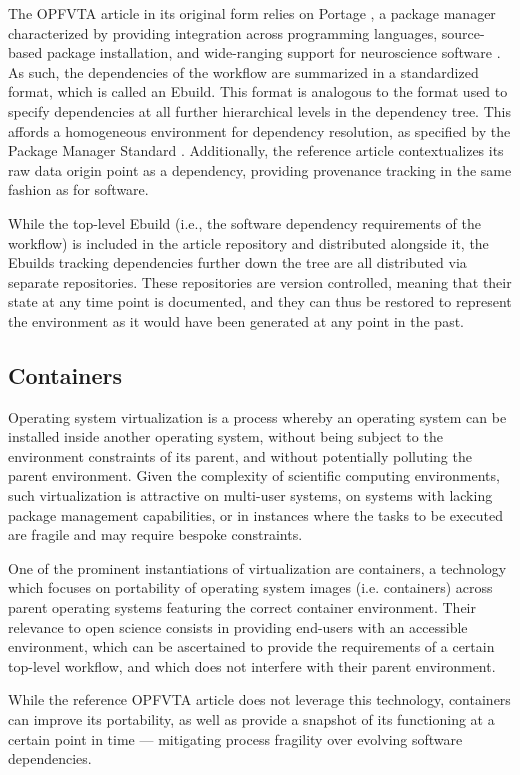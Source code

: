 The OPFVTA article in its original form relies on Portage \supercite{portage}, a package manager characterized by providing integration across programming languages, source-based package installation, and wide-ranging support for neuroscience software \supercite{ng}.
As such, the dependencies of the workflow are summarized in a standardized format, which is called an Ebuild.
This format is analogous to the format used to specify dependencies at all further hierarchical levels in the dependency tree.
This affords a homogeneous environment for dependency resolution, as specified by the Package Manager Standard \supercite{pms}.
Additionally, the reference article contextualizes its raw data origin point as a dependency, providing provenance tracking in the same fashion as for software.

While the top-level Ebuild (i.e., the software dependency requirements of the workflow) is included in the article repository and distributed alongside it, the Ebuilds tracking dependencies further down the tree are all distributed via separate repositories.
These repositories are version controlled, meaning that their state at any time point is documented, and they can thus be restored to represent the environment as it would have been generated at any point in the past.

\subsection{Containers}

Operating system virtualization is a process whereby an operating system can be installed inside another operating system, without being subject to the environment constraints of its parent, and without potentially polluting the parent environment.
Given the complexity of scientific computing environments, such virtualization is attractive on multi-user systems, on systems with lacking package management capabilities, or in instances where the tasks to be executed are fragile and may require bespoke constraints.

One of the prominent instantiations of virtualization are containers, a technology which focuses on portability of operating system images (i.e. containers) across parent operating systems featuring the correct container environment.
Their relevance to open science consists in providing end-users with an accessible environment, which can be ascertained to provide the requirements of a certain top-level workflow, and which does not interfere with their parent environment.

While the reference OPFVTA article does not leverage this technology, containers can improve its portability, as well as provide a snapshot of its functioning at a certain point in time — mitigating process fragility over evolving software dependencies.
